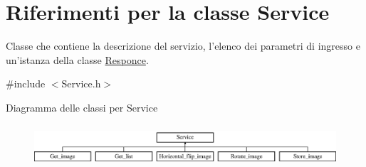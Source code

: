 \hypertarget{class_service}{\section{Riferimenti per la classe Service}
\label{class_service}
}


Classe che contiene la descrizione del servizio, l'elenco dei parametri di ingresso e un'istanza della classe {\ttfamily \hyperlink{class_responce}{Responce}}.  




{\ttfamily \#include $<$Service.\-h$>$}

Diagramma delle classi per Service\begin{figure}[H]
\begin{center}
\leavevmode
\includegraphics[height=1.588652cm]{class_service}
\end{center}
\end{figure}
